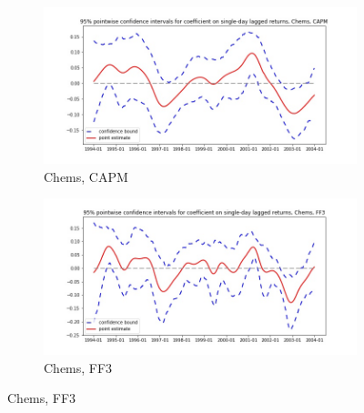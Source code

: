 \documentclass{article}
\begin{document}
  \begin{figure}
  \begin{subfigure}[b]{0.5\textwidth}
    \centering
    \includegraphics[width=\textwidth]{Chems/pointwiseCIs_CAPM.jpg}
    \caption{Chems, CAPM}
    \label{fig:1}
  \end{subfigure}
  \begin{subfigure}[b]{0.5\textwidth}
    \centering
    \includegraphics[width=\textwidth]{Chems/pointwiseCIs_FF3.jpg}
    \caption{Chems, FF3}
    \label{fig:2}
  \end{subfigure}
  \end{figure}
  
\end{document}
